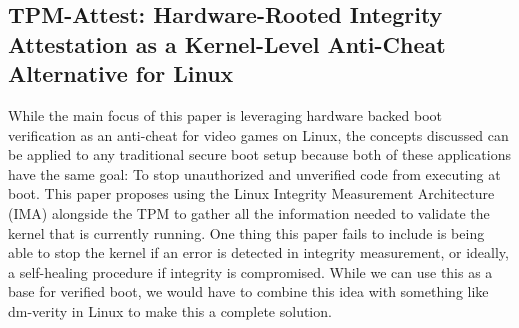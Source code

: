 \documentclass[letterpaper,twocolumn,10pt]{article}
\begin{document}


\subsection{TPM-Attest: Hardware-Rooted Integrity Attestation as a Kernel-Level Anti-Cheat Alternative for Linux \cite{gedela2026tpmattesthardwarerootedintegrityattestation}}

While the main focus of this paper is leveraging hardware backed boot verification as an anti-cheat
for video games on Linux, the concepts discussed can be applied to any traditional secure boot 
setup because both of these applications have the same goal: To stop unauthorized and unverified
code from executing at boot. This paper proposes using the Linux Integrity Measurement 
Architecture (IMA) alongside the TPM to gather all the information needed to validate the kernel
that is currently running. One thing this paper fails to include is being able to stop the kernel if an error is detected in integrity measurement, or ideally, a self-healing procedure if 
integrity is compromised. While we can use this as a base for verified boot, we would have to 
combine this idea with something like dm-verity in Linux to make this a complete solution.
\end{document}
